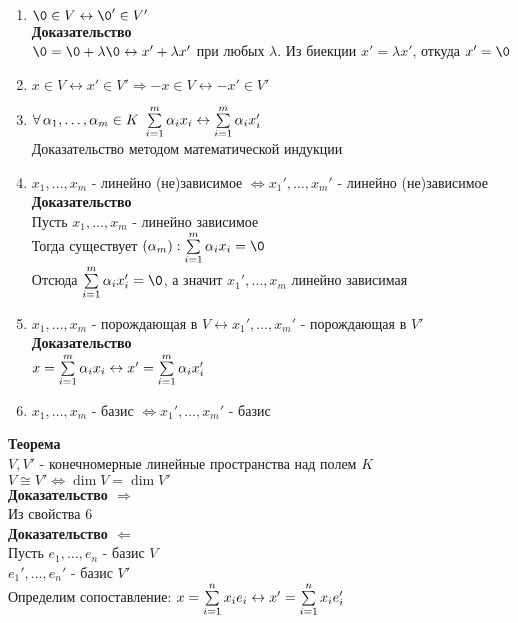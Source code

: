 \documentclass[12pt]{article}
\begin{document}
\begin{enumerate}
    \item $\0 \in V \leftrightarrow \0' \in V'$\\
    \textbf{Доказательство}\\
    $\0 = \0 + \lambda\0 \leftrightarrow x' + \lambda x'$ при любых $\lambda$. Из биекции $x' = \lambda x'$, откуда $x' = \0$
    \item $x \in V \leftrightarrow x' \in V' \Rightarrow -x \in V \leftrightarrow -x' \in V'$
    \item $\forall\, \alpha_1,\ldots, \alpha_m \in K\ \sum\limits_{i=1}^m \alpha_i x_i \leftrightarrow \sum\limits_{i=1}^m \alpha_i x_i'$\\
    Доказательство методом математической индукции
    \item $x_1,\ldots, x_m$ - линейно (не)зависимое $\Leftrightarrow x_1',\ldots,x_m'$ - линейно (не)зависимое\\
    \textbf{Доказательство}\\
    Пусть $x_1,\ldots, x_m$ - линейно зависимое\\
    Тогда существует $(\alpha_m): \suml_{i=1}^m \alpha_i x_i = \0$\\
    Отсюда $\suml_{i=1}^m \alpha_i x_i' = \0$, а значит $x_1',\ldots,x_m$ линейно зависимая
    \item $x_1,\ldots,x_m$ - порождающая в $V \leftrightarrow x_1',\ldots,x_m'$ - порождающая в $V'$\\
    \textbf{Доказательство}\\
    $x = \sum\limits_{i=1}^m \alpha_i x_i \leftrightarrow x' = \sum\limits_{i=1}^m\alpha_i x_i'$
    \item $x_1,\ldots, x_m$ - базис $\Leftrightarrow x_1',\ldots,x_m'$ - базис
\end{enumerate}
\textbf{Теорема}\\
$V, V'$ - конечномерные линейные пространства над полем $K$\\
$V \cong V' \Leftrightarrow \dim V = \dim V'$\\
\textbf{Доказательство $\Rightarrow$}\\
Из свойства 6\\
\textbf{Доказательство $\Leftarrow$}\\
Пусть $e_1, \ldots, e_n$ - базис $V$\\
$e_1', \ldots, e_n'$ - базис $V'$\\
Определим сопоставление: $x = \sum\limits_{i=1}^n x_i e_i \leftrightarrow x' = \sum\limits_{i=1}^n x_i e_i'$\\
\end{document}
